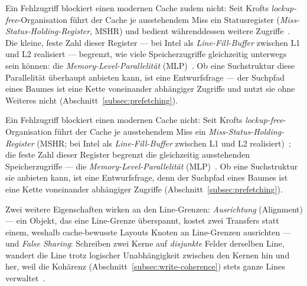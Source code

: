 \begin{nurlang}
Ein Fehlzugriff blockiert einen modernen Cache zudem nicht: Seit Krofts
\emph{lockup-free}-Organisation führt der Cache je ausstehendem Miss ein Statusregister
(\emph{Miss-Status-Holding-Register}, MSHR) und bedient währenddessen weitere
Zugriffe~\cite{kroft1981lockupfree}. Die kleine, feste Zahl dieser Register --- bei Intel als
\emph{Line-Fill-Buffer} zwischen L1 und L2 realisiert --- begrenzt, wie viele Speicherzugriffe
gleichzeitig unterwegs sein können: die \emph{Memory-Level-Parallelität}
(MLP)~\cite{hennessy2019architecture,intel_optimization}. Ob eine Suchstruktur diese Parallelität
überhaupt anbieten kann, ist eine Entwurfsfrage --- der Suchpfad eines Baumes ist eine Kette
voneinander abhängiger Zugriffe und nutzt sie ohne Weiteres nicht
(Abschnitt~\ref{subsec:prefetching}).
\end{nurlang}
\begin{nurkurz}
Ein Fehlzugriff blockiert einen modernen Cache nicht: Seit Krofts \emph{lockup-free}-Organisation führt der Cache
je ausstehendem Miss ein \emph{Miss-Status-Holding-Register} (MSHR\@; bei Intel als \emph{Line-Fill-Buffer} zwischen
L1 und L2 realisiert)~\cite{kroft1981lockupfree}; die feste Zahl dieser Register begrenzt die gleichzeitig
ausstehenden Speicherzugriffe --- die \emph{Memory-Level-Parallelität}
(MLP)~\cite{hennessy2019architecture,intel_optimization}. Ob eine Suchstruktur sie anbieten kann, ist eine
Entwurfsfrage, denn der Suchpfad eines Baumes ist eine Kette voneinander abhängiger Zugriffe
(Abschnitt~\ref{subsec:prefetching}).
\end{nurkurz}

Zwei weitere Eigenschaften wirken an den Line-Grenzen: \emph{Ausrichtung} (Alignment) --- ein Objekt,
das eine Line-Grenze überspannt, kostet zwei Transfers statt einem, weshalb cache-bewusste Layouts
Knoten an Line-Grenzen ausrichten --- und \emph{False Sharing}: Schreiben zwei Kerne auf
\emph{disjunkte} Felder derselben Line, wandert die Line trotz logischer Unabhängigkeit zwischen den
Kernen hin und her, weil die Kohärenz (Abschnitt~\ref{subsec:write-coherence}) stets ganze Lines
verwaltet~\cite{drepper2007memory,intel_optimization}.

